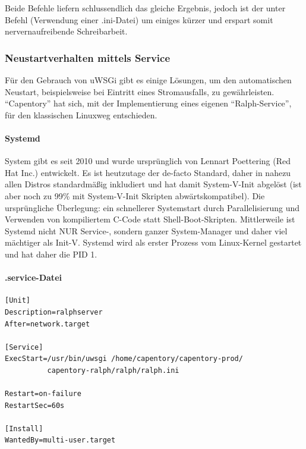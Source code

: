 Beide Befehle liefern schlussendlich das gleiche Ergebnis, jedoch ist
der unter Befehl (Verwendung einer .ini-Datei) um einiges kürzer und
erspart somit nervernaufreibende Schreibarbeit.

\hypertarget{neustartverhalten-mittels-service}{%
\subsubsection{Neustartverhalten mittels
Service}\label{neustartverhalten-mittels-service}}

Für den Gebrauch von uWSGi gibt es einige Lösungen, um den automatischen
Neustart, beispielsweise bei Eintritt eines Stromausfalls, zu
gewährleisten. ``Capentory'' hat sich, mit der Implementierung eines
eigenen ``Ralph-Service'', für den klassischen Linuxweg entschieden.

\hypertarget{systemd}{%
\paragraph{Systemd}\label{systemd}}

System gibt es seit 2010 und wurde ursprünglich von Lennart Poettering
(Red Hat Inc.) entwickelt. Es ist heutzutage der de-facto Standard,
daher in nahezu allen Distros standardmäßig inkludiert und hat damit
System-V-Init abgelöst (ist aber noch zu 99\% mit System-V-Init Skripten
abwärtskompatibel). Die ursprüngliche Überlegung: ein schnellerer
Systemstart durch Parallelisierung und Verwenden von kompiliertem C-Code
statt Shell-Boot-Skripten. Mittlerweile ist Systemd nicht NUR Service-,
sondern ganzer System-Manager und daher viel mächtiger als Init-V.
Systemd wird als erster Prozess vom Linux-Kernel gestartet und hat daher
die PID 1.

\hypertarget{service-datei}{%
\paragraph{.service-Datei}\label{service-datei}}

\begin{verbatim}
[Unit]
Description=ralphserver
After=network.target

[Service]
ExecStart=/usr/bin/uwsgi /home/capentory/capentory-prod/
          capentory-ralph/ralph/ralph.ini

Restart=on-failure
RestartSec=60s

[Install]
WantedBy=multi-user.target
\end{verbatim}

